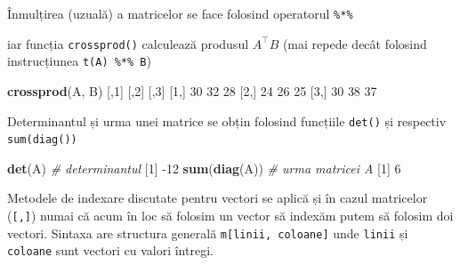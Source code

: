 \documentclass[]{article}
\newenvironment{Shaded}{\begin{snugshade}}{\end{snugshade}}
\newcommand{\CommentTok}[1]{\textcolor[rgb]{0.56,0.35,0.01}{\textit{#1}}}
\newcommand{\DecValTok}[1]{\textcolor[rgb]{0.00,0.00,0.81}{#1}}
\newcommand{\KeywordTok}[1]{\textcolor[rgb]{0.13,0.29,0.53}{\textbf{#1}}}
\newcommand{\NormalTok}[1]{#1}
\newcommand{\OperatorTok}[1]{\textcolor[rgb]{0.81,0.36,0.00}{\textbf{#1}}}
\newcommand{\StringTok}[1]{\textcolor[rgb]{0.31,0.60,0.02}{#1}}
\begin{document}
Înmulțirea (uzuală) a matricelor se face folosind operatorul
\texttt{\%*\%}

\begin{Shaded}
\end{Shaded}

iar funcția \texttt{crossprod()} calculează produsul \(A^\intercal B\)
(mai repede decât folosind instrucțiunea \texttt{t(A)\ \%*\%\ B})

\begin{Shaded}
\begin{Highlighting}[]
\KeywordTok{crossprod}\NormalTok{(A, B)}
\NormalTok{     [,}\DecValTok{1}\NormalTok{] [,}\DecValTok{2}\NormalTok{] [,}\DecValTok{3}\NormalTok{]}
\NormalTok{[}\DecValTok{1}\NormalTok{,]   }\DecValTok{30}   \DecValTok{32}   \DecValTok{28}
\NormalTok{[}\DecValTok{2}\NormalTok{,]   }\DecValTok{24}   \DecValTok{26}   \DecValTok{25}
\NormalTok{[}\DecValTok{3}\NormalTok{,]   }\DecValTok{30}   \DecValTok{38}   \DecValTok{37}
\end{Highlighting}
\end{Shaded}

Determinantul și urma unei matrice se obțin folosind funcțiile
\texttt{det()} și respectiv \texttt{sum(diag())}

\begin{Shaded}
\begin{Highlighting}[]
\KeywordTok{det}\NormalTok{(A) }\CommentTok{# determinantul}
\NormalTok{[}\DecValTok{1}\NormalTok{] }\DecValTok{-12}
\KeywordTok{sum}\NormalTok{(}\KeywordTok{diag}\NormalTok{(A)) }\CommentTok{# urma matricei A}
\NormalTok{[}\DecValTok{1}\NormalTok{] }\DecValTok{6}
\end{Highlighting}
\end{Shaded}

Metodele de indexare discutate pentru vectori se aplică și în cazul
matricelor (\texttt{{[},{]}}) numai că acum în loc să folosim un vector
să indexăm putem să folosim doi vectori. Sintaxa are structura generală
\texttt{m{[}linii,\ coloane{]}} unde \texttt{linii} și \texttt{coloane}
sunt vectori cu valori întregi.
\end{document}
